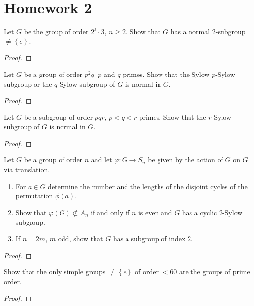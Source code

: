 \section{Homework 2}
\begin{problem}
Let $G$ be the group of order $2^3\cdot 3$, $n\geq 2$. Show that $G$ has a
normal $2$-subgroup $\neq\left\{e\right\}$.
\end{problem}
\begin{proof}
\end{proof}

\begin{problem}
Let $G$ be a group of order $p^2q$, $p$ and $q$ primes. Show that the Sylow
$p$-Sylow subgroup or the $q$-Sylow subgroup of $G$ is normal in $G$.
\end{problem}
\begin{proof}
\end{proof}

\begin{problem}
Let $G$ be a subgroup of order $pqr$, $p<q<r$ primes. Show that the
$r$-Sylow subgroup of $G$ is normal in $G$.
\end{problem}
\begin{proof}
\end{proof}

\begin{problem}
Let $G$ be a group of order $n$ and let $\varphi\colon G\to S_n$ be given by
the action of $G$ on $G$ via translation.
\begin{enumerate}[label=(\alph*)]
\item For $a\in G$ determine the number and the lengths of the disjoint
  cycles of the permutation $\phi(a)$.
\item Show that $\varphi(G)\nsubset A_n$ if and only if $n$ is even and $G$
  has a cyclic $2$-Sylow subgroup.
\item If $n=2m$, $m$ odd, show that $G$ has a subgroup of index $2$.
\end{enumerate}
\end{problem}
\begin{proof}
\end{proof}

\begin{problem}
Show that the only simple groups $\neq\left\{e\right\}$ of order $<60$ are
the groups of prime order.
\end{problem}
\begin{proof}
\end{proof}

